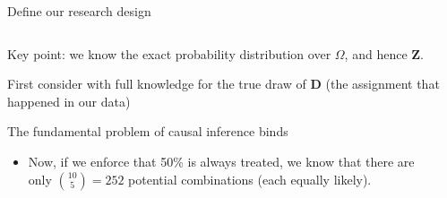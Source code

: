 \documentclass[notes,11pt, aspectratio=169]{beamer}
\newenvironment{wideitemize}{\itemize\addtolength{\itemsep}{10pt}}{\enditemize}
\begin{document}
\begin{frame}{Define our research design}
\begin{columns}[T] %
  \begin{column}{.7\textwidth}
  \begin{wideitemize}
  \item Key point: we know the exact probability distribution over
    $\Omega$, and hence $\mathbf{Z}$.
  \item<2-> First consider with full knowledge for the true draw of
    $\mathbf{D}$ (the assignment that happened in our data)
  \item<3-> The fundamental problem of causal inference  binds
    \begin{itemize}
    \item Now, if we enforce that 50\% is always treated, we know that
      there are only ${10 \choose 5}= 252$ potential combinations
      (each equally likely).
    \end{itemize}

    \end{wideitemize}
  \end{column}%
  \hfill%
  \begin{column}{.4\textwidth}


\end{column}
\end{columns}
\end{frame}
\end{document}

